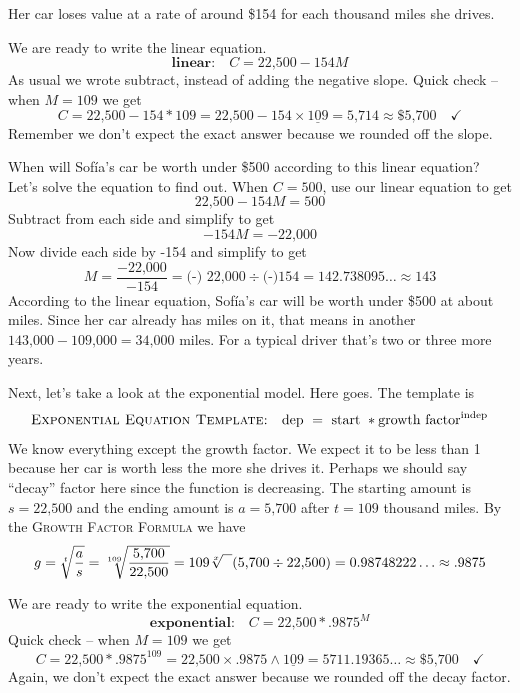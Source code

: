 \noindent
Her car loses value at a rate of around \$154 for each thousand miles she drives.  

We are ready to write the linear equation.  
$$\textbf{linear:} \quad C = \text{22,500} - 154M$$  
As usual we wrote subtract, instead of adding the negative slope.
Quick check -- when $M=109$ we get $$C =  \text{22,500} - 154\ast 109 =  \text{22,500} - 154\times \underline{109}= \text{5,714} \approx \$\text{5,700} \quad \checkmark$$
Remember we don't expect the exact answer because we rounded off the slope.  

When will Sof\'{i}a's car be worth under \$500 according to this linear equation?  Let's solve the equation to find out.  When $C=500$, use our linear equation to get  %
$$ \text{22,500} - 154M =500$$
Subtract  from each side and simplify to get
$$-154M= -\text{22,000}$$
 Now divide each side by -154 and simplify to get
$$M = \frac{-\text{22,000}}{-154} = \text{(-) 22,000} \div  \text{(-)}154= 142.738095\ldots \approx 143$$
According to the linear equation, Sof\'{i}a's car will be worth under \$500 at about  miles.  Since her car already has  miles on it, that means in another $\text{143,000}-\text{109,000} = \text{34,000 miles}$.  For a typical driver that's two or three more years.

Next, let's take a look at the exponential model.  Here goes.  The template is $$\textsc{Exponential Equation Template:} \quad \text{dep }=\text{ start } \ast \text{growth factor}^{\text{indep}}$$
We know everything except the growth factor.   We expect it to be less than 1 because her car is worth less the more she drives it.  Perhaps we should say ``decay'' factor here since the function is decreasing. The starting amount is $s=\text{22,500}$ and the ending amount is $a=\text{5,700}$ after $t=109$ thousand miles.  By the  \textsc{Growth Factor Formula} we have
$$g = \sqrt[t]{\frac{a}{s}} = \sqrt[109]{\frac{\text{5,700}}{\text{22,500}}}
= 109  \sqrt[x]{\text{\raisebox{.6em}{~\text{  }}}}( \text{5,700} \div \text{22,500})= 0.98748222\ldots \approx .9875$$

We are ready to write the exponential equation.  
$$\textbf{exponential:} \quad C = \text{22,500} \ast .9875^M$$
Quick check -- when $M=109$ we get $$C =  \text{22,500} \ast .9875^{109} =  \text{22,500} \times .9875 \wedge\underline{109}= 5711.19365\ldots \approx \$\text{5,700} \quad \checkmark$$
Again, we don't expect the exact answer because we rounded off the decay factor.  

